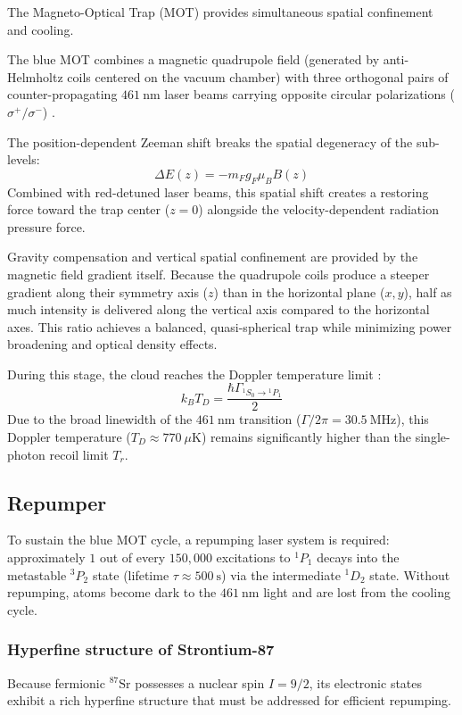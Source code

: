 The Magneto-Optical Trap (MOT) provides simultaneous spatial confinement and cooling. 

The blue MOT combines a magnetic quadrupole field (generated by anti-Helmholtz coils centered on the vacuum chamber) with three orthogonal pairs of counter-propagating $461~\text{nm}$ laser beams carrying opposite circular polarizations ($\sigma^+/\sigma^-$) \cite{phillips_laser_1998}. 

The position-dependent Zeeman shift breaks the spatial degeneracy of the sub-levels:
\begin{equation}
\Delta E(z) = - m_F g_F \mu_B B(z)
\end{equation}
Combined with red-detuned laser beams, this spatial shift creates a restoring force toward the trap center ($z = 0$) alongside the velocity-dependent radiation pressure force.

Gravity compensation and vertical spatial confinement are provided by the magnetic field gradient itself. Because the quadrupole coils produce a steeper gradient along their symmetry axis ($z$) than in the horizontal plane ($x, y$), half as much intensity is delivered along the vertical axis compared to the horizontal axes. This ratio achieves a balanced, quasi-spherical trap while minimizing power broadening and optical density effects.

During this stage, the cloud reaches the Doppler temperature limit \cite{dalibard_atomes_froids}:
\begin{equation}
k_B T_D = \frac{\hbar \Gamma_{^1S_0 \rightarrow {}^1P_1}}{2}
\end{equation}
Due to the broad linewidth of the $461~\text{nm}$ transition ($\Gamma/2\pi = 30.5~\text{MHz}$), this Doppler temperature ($T_D \approx 770~\mu\text{K}$) remains significantly higher than the single-photon recoil limit $T_r$.

\subsection{Repumper}

To sustain the blue MOT cycle, a repumping laser system is required: approximately $1$ out of every $150{,}000$ excitations to $^1P_1$ decays into the metastable $^3P_2$ state (lifetime $\tau \approx 500~\text{s}$) via the intermediate $^1D_2$ state. Without repumping, atoms become dark to the $461~\text{nm}$ light and are lost from the cooling cycle.

\subsubsection{Hyperfine structure of Strontium-87}
Because fermionic $^{87}\text{Sr}$ possesses a nuclear spin $I = 9/2$, its electronic states exhibit a rich hyperfine structure that must be addressed for efficient repumping.

